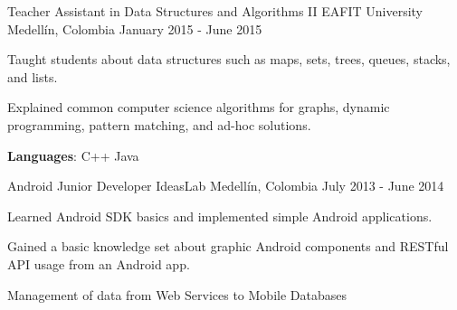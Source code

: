 \begin{cventries}
{\begin{cvsubentries}
                      {}{}
      \end{cvsubentries}
    }
  \cventry
    {Teacher Assistant in Data Structures and Algorithms II}
    {EAFIT University}
    {Medellín, Colombia}
    {January 2015 - June 2015}
    {
      \begin{cvitems}
        \item {Taught students about data structures such as maps, sets, trees, queues, stacks, and lists.}
        \item {Explained common computer science algorithms for graphs, dynamic programming, pattern matching, and ad-hoc solutions.}
        \item {\textbf{Languages}: C++ {\dotsep}  {\dotsep} Java {\dotsep} }
      \end{cvitems}
    }
  \cventry
    {Android Junior Developer}
    {IdeasLab}
    {Medellín, Colombia}
    {July 2013 - June 2014}
    {
      \begin{cvitems}
        \item {Learned Android SDK basics and implemented simple Android applications.}
        \item {Gained a basic knowledge set about graphic Android components and RESTful API usage from an Android app.}
        \item {Management of data from Web Services to Mobile Databases}
      \end{cvitems}
    }
\end{cventries}
